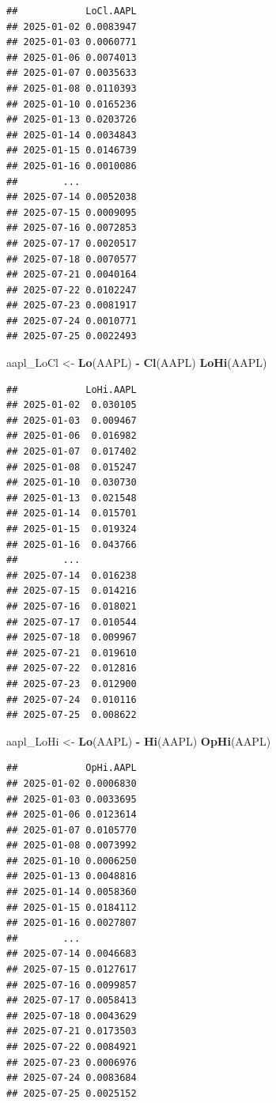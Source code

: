 \documentclass[]{ctexbook}
\newenvironment{Shaded}{\begin{snugshade}}{\end{snugshade}}
\newcommand{\FunctionTok}[1]{\textcolor[rgb]{0.13,0.29,0.53}{\textbf{#1}}}
\newcommand{\NormalTok}[1]{#1}
\newcommand{\OtherTok}[1]{\textcolor[rgb]{0.56,0.35,0.01}{#1}}
\newcommand{\SpecialCharTok}[1]{\textcolor[rgb]{0.81,0.36,0.00}{\textbf{#1}}}
\begin{document}
\begin{verbatim}
##            LoCl.AAPL
## 2025-01-02 0.0083947
## 2025-01-03 0.0060771
## 2025-01-06 0.0074013
## 2025-01-07 0.0035633
## 2025-01-08 0.0110393
## 2025-01-10 0.0165236
## 2025-01-13 0.0203726
## 2025-01-14 0.0034843
## 2025-01-15 0.0146739
## 2025-01-16 0.0010086
##        ...          
## 2025-07-14 0.0052038
## 2025-07-15 0.0009095
## 2025-07-16 0.0072853
## 2025-07-17 0.0020517
## 2025-07-18 0.0070577
## 2025-07-21 0.0040164
## 2025-07-22 0.0102247
## 2025-07-23 0.0081917
## 2025-07-24 0.0010771
## 2025-07-25 0.0022493
\end{verbatim}

\begin{Shaded}
\begin{Highlighting}[]
\NormalTok{aapl\_LoCl }\OtherTok{\textless{}{-}} \FunctionTok{Lo}\NormalTok{(AAPL) }\SpecialCharTok{{-}} \FunctionTok{Cl}\NormalTok{(AAPL)}
\FunctionTok{LoHi}\NormalTok{(AAPL)}
\end{Highlighting}
\end{Shaded}

\begin{verbatim}
##            LoHi.AAPL
## 2025-01-02  0.030105
## 2025-01-03  0.009467
## 2025-01-06  0.016982
## 2025-01-07  0.017402
## 2025-01-08  0.015247
## 2025-01-10  0.030730
## 2025-01-13  0.021548
## 2025-01-14  0.015701
## 2025-01-15  0.019324
## 2025-01-16  0.043766
##        ...          
## 2025-07-14  0.016238
## 2025-07-15  0.014216
## 2025-07-16  0.018021
## 2025-07-17  0.010544
## 2025-07-18  0.009967
## 2025-07-21  0.019610
## 2025-07-22  0.012816
## 2025-07-23  0.012900
## 2025-07-24  0.010116
## 2025-07-25  0.008622
\end{verbatim}

\begin{Shaded}
\begin{Highlighting}[]
\NormalTok{aapl\_LoHi }\OtherTok{\textless{}{-}} \FunctionTok{Lo}\NormalTok{(AAPL) }\SpecialCharTok{{-}} \FunctionTok{Hi}\NormalTok{(AAPL)}
\FunctionTok{OpHi}\NormalTok{(AAPL)}
\end{Highlighting}
\end{Shaded}

\begin{verbatim}
##            OpHi.AAPL
## 2025-01-02 0.0006830
## 2025-01-03 0.0033695
## 2025-01-06 0.0123614
## 2025-01-07 0.0105770
## 2025-01-08 0.0073992
## 2025-01-10 0.0006250
## 2025-01-13 0.0048816
## 2025-01-14 0.0058360
## 2025-01-15 0.0184112
## 2025-01-16 0.0027807
##        ...          
## 2025-07-14 0.0046683
## 2025-07-15 0.0127617
## 2025-07-16 0.0099857
## 2025-07-17 0.0058413
## 2025-07-18 0.0043629
## 2025-07-21 0.0173503
## 2025-07-22 0.0084921
## 2025-07-23 0.0006976
## 2025-07-24 0.0083684
## 2025-07-25 0.0025152
\end{verbatim}
\end{document}
